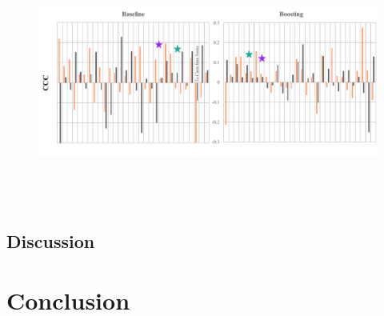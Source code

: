 \documentclass{article}
\begin{document}
\begin{figure}[h]
\includegraphics[width=\textwidth, height = 8cm]{comparison}
\centering
\end{figure}

\subsection{Discussion}

\section{Conclusion}

\footnotesize{
\begin{spacing}{.85 }


\end{spacing}
}
\end{document}
